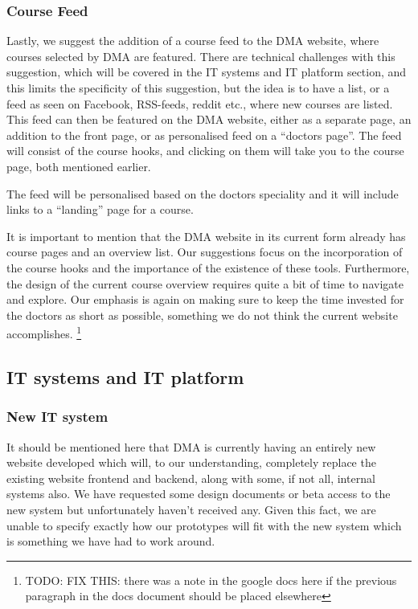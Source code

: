 \subsubsection{Course Feed}
Lastly, we suggest the addition of a course feed to the DMA website, where courses selected by DMA are featured. There are technical challenges with this suggestion, which will be covered in the IT systems and IT platform section, and this limits the specificity of this suggestion, but the idea is to have a list, or a feed as seen on Facebook, RSS-feeds, reddit etc., where new courses are listed. This feed can then be featured on the DMA website, either as a separate page, an addition to the front page, or as personalised feed on a “doctors page”. The feed will consist of the course hooks, and clicking on them will take you to the course page, both mentioned earlier. 

The feed will be personalised based on the doctors speciality and it will include links to a “landing” page for a course. 

It is important to mention that the DMA website in its current form already has course pages and an overview list. Our suggestions focus on the incorporation of the course hooks and the importance of the existence of these tools. Furthermore, the design of the current course overview requires quite a bit of time to navigate and explore. Our emphasis is again on making sure to keep the time invested for the doctors as short as possible, something we do not think the current website accomplishes. 
\footnote{TODO: FIX THIS: there was a note in the google docs here if the previous paragraph in the docs document should be placed elsewhere}



\subsection{IT systems and IT platform}
\subsubsection{New IT system}
It should be mentioned here that DMA is currently having an entirely new website developed which will, to our understanding, completely replace the existing website frontend and backend, along with some, if not all, internal systems also. We have requested some design documents or beta access to the new system but unfortunately haven’t received any. Given this fact, we are unable to specify exactly how our prototypes will fit with the new system which is something we have had to work around.

